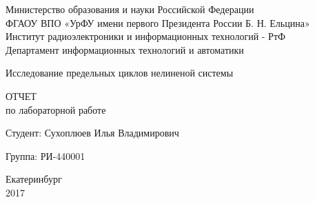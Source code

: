 \documentclass[12pt]{report}
\begin{document}
\begin{titlepage}
  \begin{center}
    Министерство образования и науки Российской Федерации\\
    ФГАОУ ВПО  «УрФУ имени первого Президента России Б. Н. Ельцина»\\
    Институт радиоэлектроники и информационных технологий - РтФ\\
    Департамент информационных технологий и автоматики
    \par
    \vspace{5.5cm}
    \Large{
      Исследование предельных циклов нелиненой системы
      
      \par
      \vspace{1cm}

      ОТЧЕТ\\
      по лабораторной работе
    }

    \vspace{5cm}
    {
      Студент: \hfill Сухоплюев Илья Владимирович
    }
    \par
    {
      Группа: \hfill РИ-440001
    }

    \par
    \vspace{5cm}
    Екатеринбург\\
    2017
  \end{center}
\end{titlepage}
\end{document}

